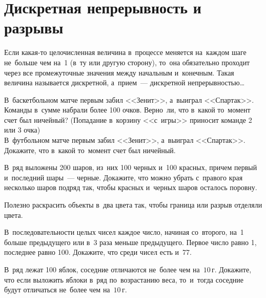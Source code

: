 
\section*{Дискретная непрерывность и разрывы}



Если какая-то целочисленная величина в~процессе меняется на~каждом шаге
не~больше чем на~1 (в~ту или другую сторону), то~она обязательно проходит через
все промежуточные значения между начальным и~конечным.
Такая величина называется дискретной, а~прием~---
дискретной непрерывностью\ldots

\begin{problems}

\item
\sp
В~баскетбольном матче первым забил <<Зенит>>, а~выиграл <<Спартак>>.
Команды в~сумме набрали более 100 очков.
Верно~ли, что в~какой то~момент счет был ничейный?
(Попадание в~корзину <<с~игры>> приносит команде 2 или 3 очка)
\\
\sp
В~футбольном матче первым забил <<Зенит>>, а~выиграл <<Спартак>>.
Докажите, что в~какой то~момент счет был ничейный.

\item
В~ряд выложены 200 шаров, из~них 100 черных и~100 красных, причем первый
и~последний шары~--- черные.
Докажите, что можно убрать с~правого края несколько шаров подряд так, чтобы
красных и~черных шаров осталось поровну.

\end{problems}

Полезно раскрасить объекты в~два цвета так, чтобы граница или разрыв отделяли
цвета.

\begin{problems}

\item
В~последовательности целых чисел каждое число, начиная со~второго, на~1 больше
предыдущего или в~3 раза меньше предыдущего.
Первое число равно 1, последнее равно 100.
Докажите, что среди чисел есть и~77.

\item
В~ряд лежат 100 яблок, соседние отличаются не~более чем на~$10\,\text{г}$.
Докажите, что если выложить яблоки в~ряд по~возрастанию веса, то~и~тогда
соседние будут отличаться не~более чем на~$10\,\text{г}$.

\end{problems}

